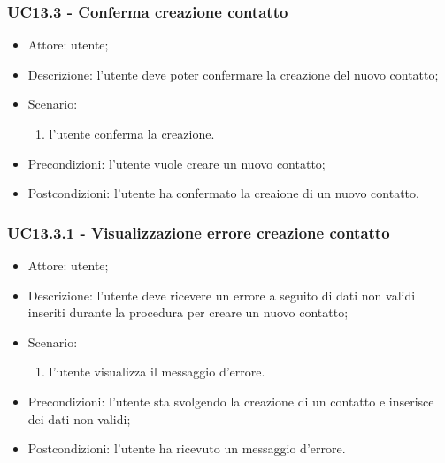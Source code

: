 \subsubsection{UC13.3 - Conferma creazione contatto} \label{sec: UC13.3}
\begin{itemize}
    \item Attore: utente;
    \item Descrizione: l'utente deve poter confermare la creazione del nuovo contatto;
    \item Scenario:
        \begin{enumerate}
        \item l'utente conferma la creazione.
        \end{enumerate}
    
    \item Precondizioni: l'utente vuole creare un nuovo contatto;
    \item Postcondizioni: l'utente ha confermato la creaione di un nuovo contatto.
\end{itemize}


\subsubsection{UC13.3.1 - Visualizzazione errore creazione contatto} \label{sec: UC13.3.1}
\begin{itemize}
    \item Attore: utente;
    \item Descrizione: l'utente deve ricevere un errore a seguito di dati non validi inseriti durante la procedura per creare un nuovo contatto;
    \item Scenario:
        \begin{enumerate}
        \item l'utente visualizza il messaggio d'errore.
        \end{enumerate}
    
    \item Precondizioni: l'utente sta svolgendo la creazione di un contatto e inserisce dei dati non validi;
    \item Postcondizioni: l'utente ha ricevuto un messaggio d'errore.
\end{itemize}


